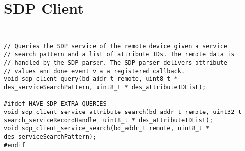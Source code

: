\section{SDP Client}
\label{appendix:api_sdp_client}
$ $
\begin{lstlisting}
 
// Queries the SDP service of the remote device given a service
// search pattern and a list of attribute IDs. The remote data is
// handled by the SDP parser. The SDP parser delivers attribute 
// values and done event via a registered callback.
void sdp_client_query(bd_addr_t remote, uint8_t * des_serviceSearchPattern, uint8_t * des_attributeIDList);

#ifdef HAVE_SDP_EXTRA_QUERIES
void sdp_client_service_attribute_search(bd_addr_t remote, uint32_t search_serviceRecordHandle, uint8_t * des_attributeIDList);
void sdp_client_service_search(bd_addr_t remote, uint8_t * des_serviceSearchPattern);
#endif
\end{lstlisting}
\pagebreak
